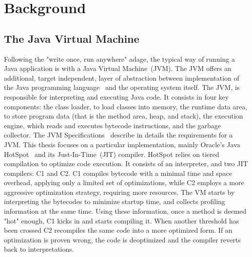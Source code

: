 \chapter{Background}


\section{The Java Virtual Machine}
Following the "write once, run anywhere" adage, the typical way of running a Java application is with a Java Virtual Machine~(JVM).
The JVM offers an additional, target independent, layer of abstraction between implementation of 
the Java programming language~\cite{noauthor_java_nodate-2} and the operating system itself.
The JVM, is responsible for interpreting and executing Java code. It consists in four key components: 
the class loader, to load classes into memory, the runtime data area, to store program data (that is the method area, heap, and stack), the execution engine, which reads and executes bytecode instructions, and the garbage collector. The JVM Specifications~\cite{noauthor_java_nodate-1} describe in details the requirements for a JVM. 
This thesis focuses on a particular implementation, mainly Oracle's Java HotSpot~\cite{noauthor_hotspot_nodate} and its Just-In-Time~(JIT) compiler. 
HotSpot relies on tiered compilation to optimize code execution. It consists of an interpreter, and two JIT compilers: C1 and C2. 
C1 compiles bytecode with a minimal time and space overhead, applying only a limited set of optimizations, while C2 employs a more aggressive optimization strategy, requiring more resources.
The VM starts by interpreting the bytecodes to minimize startup time, and collects profiling information at the same time. Using these information, once a method is deemed "hot" enough, C1 kicks in and starts compiling it. When another threshold has been crossed C2 
recompiles the same code into a more optimized form. If an optimization is proven wrong, the code is 
deoptimized and the compiler reverts back to interpretations.  

